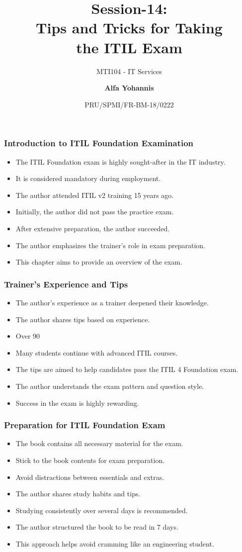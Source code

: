 \documentclass[aspectratio=169, table]{beamer}
\subtitle{MTI104 - IT Services}
\title{Session-14:\\\LARGE{Tips and Tricks for Taking \\the ITIL Exam}}
\date[Serial]{\scriptsize {PRU/SPMI/FR-BM-18/0222}}
\author[Pradita]{\small{\textbf{Alfa Yohannis}}}
\begin{document}
\frame{\titlepage}

\begin{frame}
	\frametitle{Introduction to ITIL Foundation Examination}
	\begin{itemize}
		\item The ITIL Foundation exam is highly sought-after in the IT industry.
		\item It is considered mandatory during employment.
		\item The author attended ITIL v2 training 15 years ago.
		\item Initially, the author did not pass the practice exam.
		\item After extensive preparation, the author succeeded.
		\item The author emphasizes the trainer's role in exam preparation.
		\item This chapter aims to provide an overview of the exam.
	\end{itemize}
\end{frame}

\begin{frame}
	\frametitle{Trainer's Experience and Tips}
	\begin{itemize}
		\item The author's experience as a trainer deepened their knowledge.
		\item The author shares tips based on experience.
		\item Over 90%
		\item Many students continue with advanced ITIL courses.
		\item The tips are aimed to help candidates pass the ITIL 4 Foundation exam.
		\item The author understands the exam pattern and question style.
		\item Success in the exam is highly rewarding.
	\end{itemize}
\end{frame}

\begin{frame}
	\frametitle{Preparation for ITIL Foundation Exam}
	\begin{itemize}
		\item The book contains all necessary material for the exam.
		\item Stick to the book contents for exam preparation.
		\item Avoid distractions between essentials and extras.
		\item The author shares study habits and tips.
		\item Studying consistently over several days is recommended.
		\item The author structured the book to be read in 7 days.
		\item This approach helps avoid cramming like an engineering student.
	\end{itemize}
\end{frame}
\end{document}
